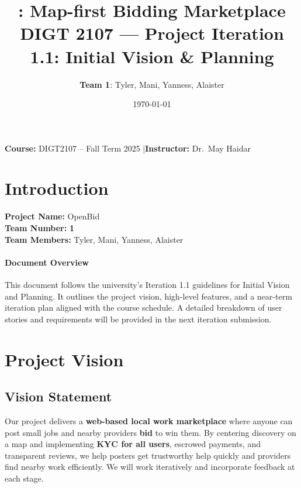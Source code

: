 \documentclass[11pt]{article}
\title{\product: Map-first Bidding Marketplace\\\Large DIGT 2107 --- Project Iteration 1.1: Initial Vision \& Planning}
\author{\textbf{Team 1}: Tyler, Mani, Yanness, Alaister}
\date{\today}
\newcommand{\product}{OpenBid}
\begin{document}
\maketitle

\begin{center}
\textbf{Course:} DIGT2107 -- Fall Term 2025 \quad|\quad \textbf{Instructor:} Dr.\ May Haidar
\end{center}

\newpage

\section{Introduction}
\textbf{Project Name:} \product \\
\textbf{Team Number:} \textbf{1} \\
\textbf{Team Members:} Tyler, Mani, Yanness, Alaister

\paragraph{Document Overview}
This document follows the university's Iteration 1.1 guidelines for Initial Vision and Planning. It outlines the project vision, high-level features, and a near-term iteration plan aligned with the course schedule. A detailed breakdown of user stories and requirements will be provided in the next iteration submission.

\section{Project Vision}
\subsection*{Vision Statement}
Our project delivers a \textbf{web-based local work marketplace} where anyone can post small jobs and nearby providers \textbf{bid} to win them. By centering discovery on a map and implementing \textbf{KYC for all users}, escrowed payments, and transparent reviews, we help posters get trustworthy help quickly and providers find nearby work efficiently. We will work iteratively and incorporate feedback at each stage.
\end{document}
